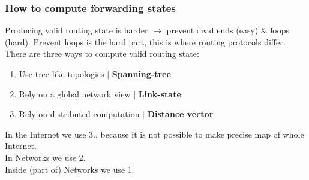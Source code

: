 \documentclass[a4paper, fontsize=8pt, landscape, DIV=1]{scrartcl}
\begin{document}
\begin{multicols*}{4}
			\subsubsection{How to compute forwarding states}\label{kap:How to compute forwarding}
			Producing valid routing state is harder $\rightarrow$ prevent dead ends (easy) \& loops (hard). Prevent loops is the hard part, this is where routing protocols differ. There are three ways to compute valid routing state: 
			\begin{enumerate}[noitemsep]
				\item Use tree-like topologies $\vert$ \textbf{Spanning-tree}
			 	\item Rely on a global network view $\vert$ \textbf{Link-state}
			 	\item Rely on distributed computation $\vert$ \textbf{Distance vector} 
		 	\end{enumerate}
			In the Internet we use 3., because it is not possible to make precise map of whole Internet.\\
			In Networks we use 2.\\
			Inside (part of) Networks we use 1. \par
			

\end{multicols*}
\end{document}
